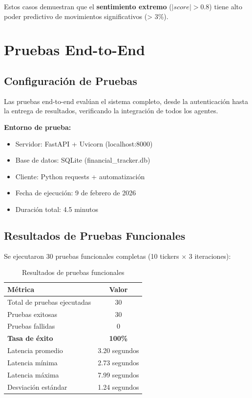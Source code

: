 \documentclass[12pt,a4paper]{report}
\begin{document}
Estos casos demuestran que el \textbf{sentimiento extremo} ($|score| > 0.8$) tiene alto poder predictivo de movimientos significativos (> 3\%).

\section{Pruebas End-to-End}

\subsection{Configuración de Pruebas}

Las pruebas end-to-end evalúan el sistema completo, desde la autenticación hasta la entrega de resultados, verificando la integración de todos los agentes.

\textbf{Entorno de prueba:}
\begin{itemize}
    \item Servidor: FastAPI + Uvicorn (localhost:8000)
    \item Base de datos: SQLite (financial\_tracker.db)
    \item Cliente: Python requests + automatización
    \item Fecha de ejecución: 9 de febrero de 2026
    \item Duración total: 4.5 minutos
\end{itemize}

\subsection{Resultados de Pruebas Funcionales}

Se ejecutaron 30 pruebas funcionales completas (10 tickers × 3 iteraciones):

\begin{table}[H]
\centering
\caption{Resultados de pruebas funcionales}
\label{tab:pruebas-funcionales}
\begin{tabular}{lc}
\toprule
\textbf{Métrica} & \textbf{Valor} \\
\midrule
Total de pruebas ejecutadas & 30 \\
Pruebas exitosas & 30 \\
Pruebas fallidas & 0 \\
\textbf{Tasa de éxito} & \textbf{100\%} \\
Latencia promedio & 3.20 segundos \\
Latencia mínima & 2.73 segundos \\
Latencia máxima & 7.99 segundos \\
Desviación estándar & 1.24 segundos \\
\bottomrule
\end{tabular}
\end{table}
\end{document}

